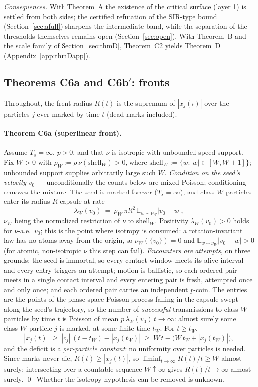 \documentclass[11pt]{article}
\newcommand{\E}{\mathbb{E}}
\newcommand{\Ts}{T_s}
\begin{document}
\smallskip
\emph{Consequences.} With Theorem~A the existence of the critical surface
(layer 1) is settled from both sides; the certified refutation of the
SIR-type bound (Section~\ref{sec:afull}) sharpens the intermediate band,
while the separation of the thresholds themselves remains open
(Section~\ref{sec:open}). With Theorem~B and the scale family of
Section~\ref{sec:thmD}, Theorem~C2 yields Theorem~D
(Appendix~\ref{app:thmDapp}).

\subsection{Theorems C6a and C6b$'$: fronts}\label{app:frontsapp}

Throughout, the front radius $R(t)$ is the supremum of $|x_j(t)|$ over the
particles $j$ ever marked by time $t$ (dead marks included).

\paragraph{Theorem C6a (superlinear front).}
Assume $\Ts=\infty$, $p>0$, and that $\nu$ is isotropic with unbounded
speed support. Fix $W>0$ with
$\rho_W:=\rho\,\nu(\mathrm{shell}_W)>0$, where
$\mathrm{shell}_W:=\{w:|w|\in[W,W+1]\}$; unbounded support supplies
arbitrarily large such $W$. \emph{Condition on the seed's velocity} $v_0$
--- unconditionally the counts below are mixed Poisson; conditioning
removes the mixture. The seed is marked forever ($\Ts=\infty$), and
class-$W$ particles enter its radius-$R$ capsule at rate
\[
  \lambda_W(v_0)\ =\ \rho_W\,\pi R^2\,\E_{w\sim\nu_W}|v_0-w| ,
\]
$\nu_W$ being the normalized restriction of $\nu$ to $\mathrm{shell}_W$.
Positivity $\lambda_W(v_0)>0$ holds for $\nu$-a.e.\ $v_0$; this is the
point where isotropy is consumed: a rotation-invariant law has no atoms
away from the origin, so $\nu_W(\{v_0\})=0$ and
$\E_{w\sim\nu_W}|v_0-w|>0$ (for atomic, non-isotropic $\nu$ this step can
fail). \emph{Encounters are attempts}, on three grounds: the seed is
immortal, so every contact window meets its alive interval and every entry
triggers an attempt; motion is ballistic, so each ordered pair meets in a
single contact interval and every entering pair is fresh, attempted once
and only once; and each ordered pair carries an independent $p$-coin. The
entries are the points of the phase-space Poisson process falling in the
capsule swept along the seed's trajectory, so the number of
\emph{successful} transmissions to class-$W$ particles by time $t$ is
Poisson of mean $p\,\lambda_W(v_0)\,t\to\infty$: almost surely some
class-$W$ particle $j$ is marked, at some finite time $t_W$. For
$t\ge t_W$,
\[
  |x_j(t)|\ \ge\ |v_j|\,(t-t_W)-|x_j(t_W)|\ \ge\
  W\,t-\bigl(W\,t_W+|x_j(t_W)|\bigr),
\]
and the deficit is a \emph{per-particle constant}: no uniformity over
particles is needed. Since marks never die, $R(t)\ge|x_j(t)|$, so
$\liminf_{t\to\infty}R(t)/t\ge W$ almost surely; intersecting over a
countable sequence $W\uparrow\infty$ gives $R(t)/t\to\infty$ almost
surely. \qed\ Whether the isotropy hypothesis can be removed is unknown.
\end{document}
